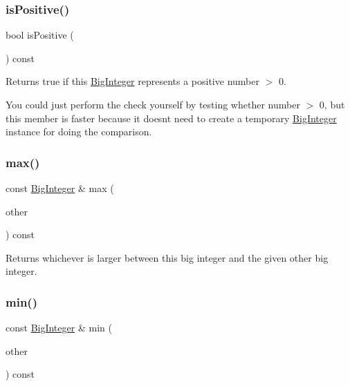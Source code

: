 \subsubsection{\texorpdfstring{is\+Positive()}{isPositive()}}
{\footnotesize\ttfamily bool is\+Positive (\begin{DoxyParamCaption}{ }\end{DoxyParamCaption}) const}



Returns true if this \mbox{\hyperlink{classBigInteger}{Big\+Integer}} represents a positive number $>$ 0. 

You could just perform the check yourself by testing whether number $>$ 0, but this member is faster because it doesn\textquotesingle{}t need to create a temporary \mbox{\hyperlink{classBigInteger}{Big\+Integer}} instance for doing the comparison. \mbox{\label{classBigInteger_a6d3e8559ebe8a6f0c8bebc756f4dd479}} 
\subsubsection{\texorpdfstring{max()}{max()}}
{\footnotesize\ttfamily const \mbox{\hyperlink{classBigInteger}{Big\+Integer}} \& max (\begin{DoxyParamCaption}\item[{const \mbox{\hyperlink{classBigInteger}{Big\+Integer}} \&}]{other }\end{DoxyParamCaption}) const}



Returns whichever is larger between this big integer and the given other big integer. 

\mbox{\label{classBigInteger_ae62de36198a0dcb836fd8680e7d71c64}} 
\subsubsection{\texorpdfstring{min()}{min()}}
{\footnotesize\ttfamily const \mbox{\hyperlink{classBigInteger}{Big\+Integer}} \& min (\begin{DoxyParamCaption}\item[{const \mbox{\hyperlink{classBigInteger}{Big\+Integer}} \&}]{other }\end{DoxyParamCaption}) const}




